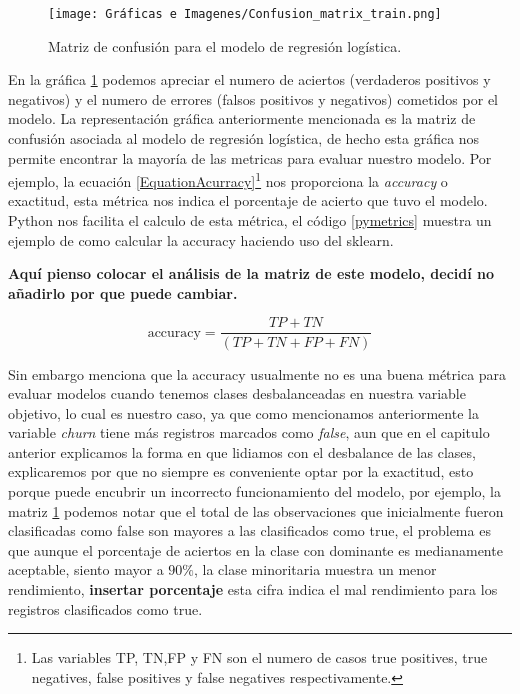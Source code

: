 \begin{figure}[h]
	\centering
	\texttt{[image: Gráficas e Imagenes/Confusion\_matrix\_train.png]}
	\caption{Matriz de confusión para el modelo de regresión logística.}
	\label{fig:MatrizConfusion}
\end{figure}

En la gráfica \ref{fig:MatrizConfusion} podemos apreciar el numero de aciertos (verdaderos positivos y negativos) y el numero de errores (falsos positivos y negativos) cometidos por el modelo. La representación gráfica anteriormente mencionada es la matriz de confusión asociada al modelo de regresión logística, de hecho esta gráfica nos permite encontrar la mayoría de las metricas para evaluar nuestro modelo. Por ejemplo, la ecuación \ref{EquationAcurracy}\footnote{Las variables TP, TN,FP y FN son el numero de casos true positives, true negatives, false positives y false negatives respectivamente.} nos proporciona la \textit{accuracy} o exactitud, esta métrica nos indica el porcentaje de acierto que tuvo el modelo. Python nos facilita el calculo de esta métrica, el código \ref{pymetrics} muestra un ejemplo de como calcular la accuracy haciendo uso del sklearn.

\textbf{Aquí pienso colocar el análisis de la matriz de este modelo, decidí no añadirlo por que puede cambiar.}

\begin{equation}
	\textrm{accuracy}=\frac{TP+TN}{(TP+TN+FP+FN)} 
	\label{EquationAcurracy}
\end{equation}

Sin embargo \citet{2023Peterson} menciona que la accuracy usualmente no es una buena métrica para evaluar modelos cuando tenemos clases desbalanceadas en nuestra variable objetivo, lo cual es nuestro caso, ya que como mencionamos anteriormente la variable \textit{churn} tiene más registros marcados como \textit{false}, aun que en el capitulo anterior explicamos la forma en que lidiamos con el desbalance de las clases, explicaremos por que no siempre es conveniente optar por la exactitud, esto porque puede encubrir un incorrecto funcionamiento del modelo, por ejemplo, la matriz \ref{fig:MatrizConfusion} podemos notar que el total de las observaciones que inicialmente fueron clasificadas como false son mayores a las clasificados como true, el problema es que aunque el porcentaje de aciertos en la clase con dominante es medianamente aceptable, siento mayor a $90\%$, la clase minoritaria muestra un menor rendimiento, \textbf{insertar porcentaje} esta cifra indica el mal rendimiento para los registros clasificados como true.

